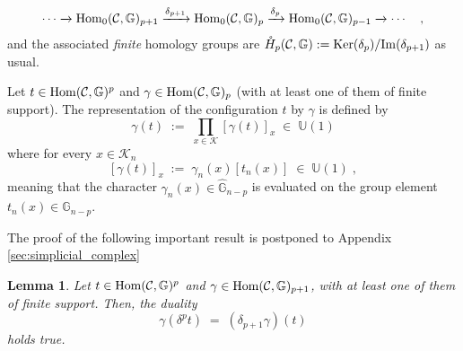 \documentclass[a4paper,12pt,twoside,reqno]{amsart}
\theoremstyle{plain}
\newtheorem{lemma}[teo]{Lemma}
\theoremstyle{definition}
\theoremstyle{remark}
\numberwithin{equation}{section}
\numberwithin{figure}{section}
\numberwithin{table}{section}
\newcommand{\f}[1]{\mathcal{#1}}
\newcommand{\n}[1]{\mathbb{#1}}
\begin{document}
	
	
	
	
	
	
	
	
	
	
	\begin{align}%
		\cdots \xrightarrow{} {\rm Hom}_0(\f{C},\n{G})_{p+1} \xrightarrow{\delta_{p+1}} {\rm Hom}_0(\f{C},\n{G})_{p} \xrightarrow{\delta_{p}} {\rm Hom}_0(\f{C},\n{G})_{p-1} \xrightarrow{} \cdots \quad ,
	\end{align}
	and the associated \emph{finite} homology groups are $\mathring{H}_{p}(\f{C},\n{G}):={\rm Ker}({\delta_p})/{\rm Im}({\delta_{p+1}})$ as usual.
	
	
	
	
	
	
	
	
	
	
	
	
	\medskip
	
	
	
	
	
	
	
	
	
	
	
	
	
	
	
	Let $t\in {\rm Hom}(\f{C},\n{G})^{p}$ and $\gamma\in {\rm Hom}(\f{C},\n{G})_{p}$ (with at least one of them of finite support). The representation of the configuration $t$ by $\gamma$
	is defined by
	\begin{equation}\label{eq:g_f}
		\gamma(t)\;:=\; \prod_{x\in \f{K}}[\gamma(t)]_x\;\in\;\n{U}(1)
	\end{equation}
	where for every $x\in \f{K}_n$
	\[
	[\gamma(t)]_x\;:=\;\gamma_n(x)[t_n(x)]\;\in\;\n{U}(1)
	\;,
	\]
	meaning that the character $\gamma_n(x)\in\widehat{\n{G}}_{n-p}$ is evaluated on the group element $t_n(x)\in {\n{G}}_{n-p}$.
	
	
	\medskip
	
	The proof of the following important result is postponed to Appendix \ref{sec:simplicial_complex} 
	\begin{lemma}\label{lem:duality}
		Let $t\in {\rm Hom}(\f{C},\n{G})^{p}$ and $\gamma\in {\rm Hom}(\f{C},\n{G})_{p+1}$, with at least one of them of finite support. Then, the duality
		\begin{equation*}
			\gamma(\delta^p t)\;=\;(\delta_{p+1}\gamma)(t)
		\end{equation*}
		holds true.
	\end{lemma}
	
\end{document}
